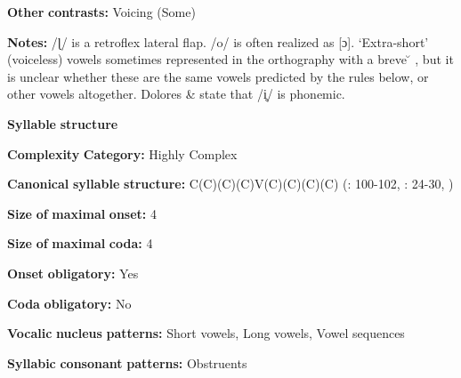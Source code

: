 \documentclass[output=paper]{langsci/langscibook}
\begin{document}
\begin{styleBody}
\textbf{Other} \textbf{contrasts:} Voicing (Some)
\end{styleBody}

\begin{styleBody}
\textbf{Notes:} /ɭ/ is a retroflex lateral flap. /o/ is often realized as [ɔ]. ‘Extra-short’ (voiceless) vowels sometimes represented in the orthography with a breve  \u{} , but it is unclear whether these are the same vowels predicted by the rules below, or other vowels altogether. Dolores \& \citet[236]{Mathiot1991} state that /i̥/ is phonemic.
\end{styleBody}

\begin{styleBody}
\textbf{Syllable} \textbf{structure}
\end{styleBody}

\begin{styleBody}
\textbf{Complexity} \textbf{Category:} Highly Complex
\end{styleBody}

\begin{styleBody}
\textbf{Canonical} \textbf{syllable} \textbf{structure:} C(C)(C)(C)V(C)(C)(C)(C) (\citealt{Saxton1982}: 100-102, \citealt{Hale1959}: 24-30, \citealt{HillZepeda1992})
\end{styleBody}

\begin{styleBody}
\textbf{Size} \textbf{of} \textbf{maximal} \textbf{onset:} 4
\end{styleBody}

\begin{styleBody}
\textbf{Size} \textbf{of} \textbf{maximal} \textbf{coda:} 4
\end{styleBody}

\begin{styleBody}
\textbf{Onset} \textbf{obligatory:} Yes
\end{styleBody}

\begin{styleBody}
\textbf{Coda} \textbf{obligatory:} No
\end{styleBody}

\begin{styleBody}
\textbf{Vocalic} \textbf{nucleus} \textbf{patterns:} Short vowels, Long vowels, Vowel sequences
\end{styleBody}

\begin{styleBody}
\textbf{Syllabic} \textbf{consonant} \textbf{patterns:} Obstruents
\end{styleBody}
\end{document}
